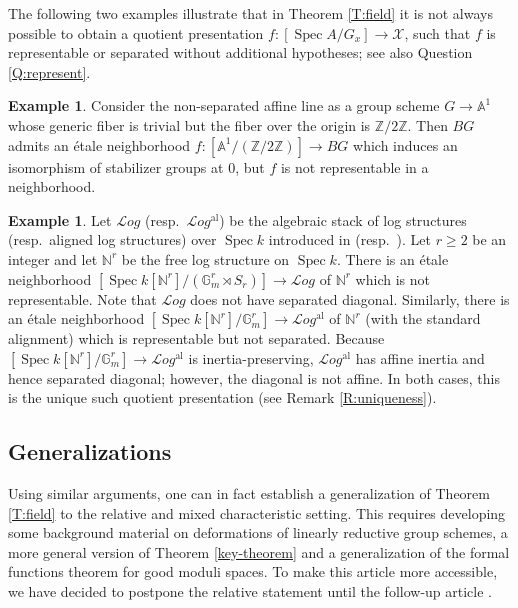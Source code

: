 \documentclass[a4paper]{amsart}
\theoremstyle{plain}
\theoremstyle{definition}
\newtheorem{example}[theorem]{Example}
\theoremstyle{remark}
\numberwithin{equation}{section}
\newcommand{\GG}{\mathbb{G}}
\renewcommand\AA{\mathbb{A}}
\newcommand\NN{\mathbb{N}}
\newcommand\ZZ{\mathbb{Z}}
\newcommand\cX{\mathcal{X}}
\newcommand\co{\colon}
\DeclareMathOperator{\Spec}{Spec}
\begin{document}
The following two examples illustrate that in Theorem \ref{T:field} it is not always possible to obtain a quotient presentation $f\colon [\Spec A/G_x]\to \cX$, such that $f$ is representable or separated without additional hypotheses; see also Question \ref{Q:represent}.

\begin{example} \label{ex5}
Consider the
non-separated affine line as a group scheme $G \to \AA^1$ whose generic fiber
is trivial but the fiber over the origin is $\ZZ/2\ZZ$.  Then $BG$ admits an
\'etale neighborhood $f \co [\AA^1/(\ZZ/2\ZZ)] \to BG$ which induces an isomorphism
of stabilizer groups at $0$, but $f$ is not representable in a neighborhood. 
\end{example}

\begin{example} \label{ex4}
Let $\mathcal{L}og$ (resp.\ $\mathcal{L}og^{\mathrm{al}}$) be the algebraic stack of log structures (resp.\ aligned log structures) over $\Spec k$ introduced in \cite{olssonloggeometry} (resp.\ \cite{acfw}).  Let $r\geq 2$ be an integer and let $\NN^r$ be the free log structure on $\Spec k$.  There is an \'etale neighborhood $[\Spec k[\NN^r] / (\GG_m^r \rtimes S_r)] \to \mathcal{L}og$ of $\NN^r$ which is not representable.  Note that $\mathcal{L}og$ does not have separated diagonal.
Similarly, there is an \'etale neighborhood $[\Spec k[\NN^r] / \GG_m^r] \to \mathcal{L}og^{\mathrm{al}}$ of $\NN^r$ (with the standard alignment) which is representable but not separated.  Because $[\Spec k[\NN^r] / \GG_m^r] \to \mathcal{L}og^{\mathrm{al}}$ is inertia-preserving, $\mathcal{L}og^{\mathrm{al}}$ has affine inertia and hence separated diagonal; however, the diagonal is not affine.
  In both cases, this is the unique such quotient presentation (see Remark \ref{R:uniqueness}).
\end{example}


\subsection{Generalizations}
Using similar arguments, one can in fact establish a generalization of Theorem \ref{T:field} to the relative and mixed characteristic setting.  This requires developing some background material on deformations of linearly reductive group schemes, a more general version of Theorem \ref{key-theorem} and a generalization of the formal functions theorem for good moduli spaces.  To make this article more accessible, we have decided to postpone the relative statement until the follow-up article \cite{ahr2}.
\end{document}
